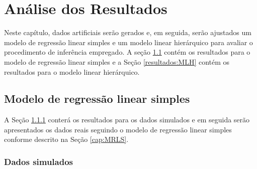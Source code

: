 \documentclass[12pt,a4paper,header]{abnt}
\begin{document}






\chapter{Análise dos Resultados} \label{analise_dos_resultados}

Neste capítulo, dados artificiais serão gerados e, em seguida, serão ajustados um modelo de regressão linear simples e um modelo linear hierárquico para avaliar o procedimento de inferência empregado. A seção \ref{resultados:MLS} contém os resultados para o modelo de regressão linear simples e a Seção \ref{resultados:MLH} contém os resultados para o modelo linear hierárquico.

\section{Modelo de regressão linear simples}\label{resultados:MLS}

A Seção \ref{resultados:MLSsim} conterá os resultados para os dados simulados e em seguida serão apresentados os dados reais seguindo o modelo de regressão linear simples conforme descrito na Seção \ref{cap:MRLS}.

\subsection{Dados simulados}\label{resultados:MLSsim}
\end{document}
